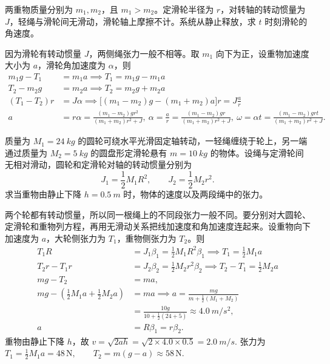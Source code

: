 \documentclass[lang=cn,11pt]{elegantbook}
\begin{document}
\begin{exercise}
两重物质量分别为 \(m_1,m_2\)，且 \(m_1>m_2\)。定滑轮半径为 \(r\)，对转轴的转动惯量为 \(J\)，轻绳与滑轮间无滑动，滑轮轴上摩擦不计。系统从静止释放，求 \(t\) 时刻滑轮的角速度。
\end{exercise}
\begin{solution}
因为滑轮有转动惯量 \(J\)，两侧绳张力一般不相等。取 \(m_1\) 向下为正，设重物加速度大小为 \(a\)，滑轮角加速度为 \(\alpha\)，则
\[
\begin{aligned}
m_1g-T_1&=m_1a\implies T_1=m_1g-m_1a\\
T_2-m_2g&=m_2a\implies T_2=m_2g+m_2a\\
(T_1-T_2)r&=J\alpha\implies \big[(m_1-m_2)g-(m_1+m_2)a\big]r=J\frac{a}{r}\\
a&=r\alpha=\frac{(m_1-m_2)gr^2}{(m_1+m_2)r^2+J},~\alpha=\frac{a}{r}
=\frac{(m_1-m_2)gr}{(m_1+m_2)r^2+J},~\omega=\alpha t
=\frac{(m_1-m_2)grt}{(m_1+m_2)r^2+J}.
\end{aligned}
\]
\end{solution}

\begin{exercise}
质量为 \(M_1=\SI{24}{kg}\) 的圆轮可绕水平光滑固定轴转动，一轻绳缠绕于轮上，另一端通过质量为 \(M_2=\SI{5}{kg}\) 的圆盘形定滑轮悬有 \(m=\SI{10}{kg}\) 的物体。设绳与定滑轮间无相对滑动，圆轮和定滑轮对轴的转动惯量分别为
\[
J_1=\frac12 M_1R^2,\qquad J_2=\frac12 M_2r^2.
\]
求当重物由静止下降 \(h=\SI{0.5}{m}\) 时，物体的速度以及两段绳中的张力。
\end{exercise}
\begin{solution}
两个轮都有转动惯量，所以同一根绳上的不同段张力一般不同。要分别对大圆轮、定滑轮和重物列方程，再用无滑动关系把线加速度和角加速度连起来。设重物向下加速度为 \(a\)，大轮侧张力为 \(T_1\)，重物侧张力为 \(T_2\)。则
\[
\begin{aligned}
T_1R&=J_1\beta_1=\frac12M_1R^2\beta_1\implies T_1=\frac12M_1a\\
T_2r-T_1r&=J_2\beta_2=\frac12M_2r^2\beta_2\implies T_2-T_1=\frac12M_2a\\
mg-T_2&=ma,\\
mg-\left(\frac12M_1a+\frac12M_2a\right)&=ma
\implies
a=\frac{mg}{m+\frac12(M_1+M_2)}\\
&=\frac{10g}{10+\frac12(24+5)}
\approx \SI{4.0}{m/s^2},\\
a&=R\beta_1=r\beta_2.
\end{aligned}
\]
重物由静止下降 \(h\)，故
 \(v=\sqrt{2ah} =\sqrt{2\times4.0\times0.5} =\SI{2.0}{m/s}.\) 
张力为
 \(T_1=\frac12M_1a=48\,\mathrm{N},\qquad T_2=m(g-a)\approx 58\,\mathrm{N}.\) 
\end{solution}
\end{document}
